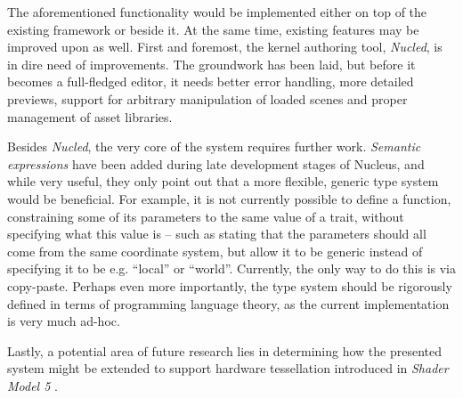 The aforementioned functionality would be implemented either on top of the existing framework or beside it. At the same time, existing features may be improved upon as well. First and foremost, the kernel authoring tool, \emph{Nucled}, is in dire need of improvements. The groundwork has been laid, but before it becomes a full-fledged editor, it needs better error handling, more detailed previews, support for arbitrary manipulation of loaded scenes and proper management of asset libraries.

Besides \emph{Nucled}, the very core of the system requires further work. \emph{Semantic expressions} have been added during late development stages of Nucleus, and while very useful, they only point out that a more flexible, generic type system would be beneficial. For example, it is not currently possible to define a function, constraining some of its parameters to the same value of a trait, without specifying what this value is -- such as stating that the parameters should all come from the same coordinate system, but allow it to be generic instead of specifying it to be e.g. ``local'' or ``world''. Currently, the only way to do this is via copy-paste. Perhaps even more importantly, the type system should be rigorously defined in terms of programming language theory, as the current implementation is very much ad-hoc.

Lastly, a potential area of future research lies in determining how the presented system might be extended to support hardware tessellation introduced in \emph{Shader Model 5} \cite{SM5}.
